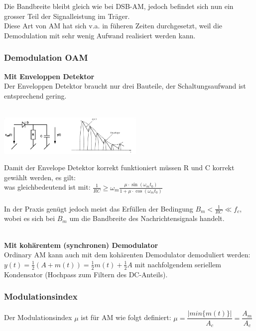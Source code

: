 Die Bandbreite bleibt gleich wie bei DSB-AM, jedoch befindet sich nun ein grosser Teil der
Signalleistung im Träger. \\
Diese Art von AM hat sich v.a. in füheren Zeiten durchgesetzt, weil die Demodulation mit sehr
wenig Aufwand realisiert werden kann. 

\subsubsection{Demodulation OAM}
\textbf{Mit Enveloppen Detektor}  \\
Der Enveloppen Detektor braucht nur drei Bauteile, der Schaltungsaufwand ist entsprechend gering.\\ \\
\begin{minipage}{7cm}	
      \includegraphics[width=7cm]{bilder/am_oam_enveloppeDetektor.png}
\end{minipage}
\begin{minipage}{11cm}
Damit der Envelope Detektor korrekt funktioniert müssen R und C korrekt gewählt werden, es gilt: \\
  was gleichbedeutend ist mit: 
$\frac{1}{RC} \geq \omega_m \frac{\mu \cdot \sin(\omega_m t_0)}{1+\mu\cdot\cos(\omega_mt_0)}$ \\ \\
In der Praxis genügt jedoch meist das Erfüllen der Bedingung $B_m < \frac{1}{RC} \ll f_c$,
wobei es sich bei $B_m$ um die Bandbreite des Nachrichtensignals handelt. 
\end{minipage} \\

\textbf{Mit kohärentem (synchronen) Demodulator}\\
Ordinary AM kann auch mit dem kohärenten Demodulator demoduliert werden:
$y(t) = \frac12 (A + m(t)) = \frac12 m(t) + \frac12 A$ mit nachfolgendem
seriellem Kondensator (Hochpass zum Filtern des DC-Anteils).


\subsubsection{Modulationsindex }
Der Modulationsindex $\mu$ ist für AM wie folgt definiert: $ \boxed{\mu = \dfrac{|min\{m(t)\}|}{A_c} = \dfrac{A_m}{A_c}}$\\

